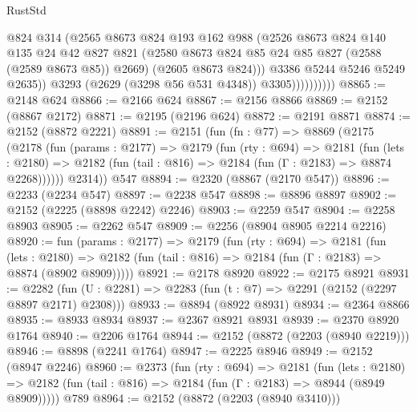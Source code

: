 \begin{lexlean}{RustStd}
\begin{coremodule}
                            @824
                            @314
                            (@2565
                              @8673
                              @824
                              @193
                              @162
                              @988
                              (@2526
                                @8673
                                @824
                                @140
                                @135
                                @24
                                @42
                                @827
                                @821
                                (@2580 @8673 @824 @85 @24 @85 @827 (@2588 (@2589 @8673 @85)) @2669)
                                (@2605 @8673 @824)))
                            @3386
                            @5244
                            @5246
                            @5249
                            @2635))
                        @3293
                        (@2629 (@3298 @56 @531 @4348))
                        @3305))))))))))
@8865 := @2148 @624
@8866 := @2166 @624
@8867 := @2156 @8866
@8869 := @2152 (@8867 @2172)
@8871 := @2195 (@2196 @624)
@8872 := @2191 @8871
@8874 := @2152 (@8872 @2221)
@8891 := @2151
    (fun (fn : @77) =>
    @8869
      (@2175
        (@2178
          (fun (params : @2177) =>
          @2179
            (fun (rty : @694) =>
            @2181
              (fun (lets : @2180) =>
              @2182 (fun (tail : @816) => @2184 (fun (Γ : @2183) => @8874 @2268))))))
        @2314))
    @547
@8894 := @2320 (@8867 (@2170 @547))
@8896 := @2233 (@2234 @547)
@8897 := @2238 @547
@8898 := @8896 @8897
@8902 := @2152 (@2225 (@8898 @2242) @2246)
@8903 := @2259 @547
@8904 := @2258 @8903
@8905 := @2262 @547
@8909 := @2256 (@8904 @8905 @2214 @2216)
@8920 := fun (params : @2177) =>
  @2179
    (fun (rty : @694) =>
    @2181
      (fun (lets : @2180) =>
      @2182 (fun (tail : @816) => @2184 (fun (Γ : @2183) => @8874 (@8902 @8909)))))
@8921 := @2178 @8920
@8922 := @2175 @8921
@8931 := @2282 (fun (U : @2281) => @2283 (fun (t : @7) => @2291 (@2152 (@2297 @8897 @2171) @2308)))
@8933 := @8894 (@8922 @8931)
@8934 := @2364 @8866
@8935 := @8933 @8934
@8937 := @2367 @8921 @8931
@8939 := @2370 @8920 @1764
@8940 := @2206 @1764
@8944 := @2152 (@8872 (@2203 (@8940 @2219)))
@8946 := @8898 (@2241 @1764)
@8947 := @2225 @8946
@8949 := @2152 (@8947 @2246)
@8960 := @2373
    (fun (rty : @694) =>
    @2181
      (fun (lets : @2180) =>
      @2182 (fun (tail : @816) => @2184 (fun (Γ : @2183) => @8944 (@8949 @8909)))))
    @789
@8964 := @2152 (@8872 (@2203 (@8940 @3410)))

\end{coremodule}
\end{lexlean}
